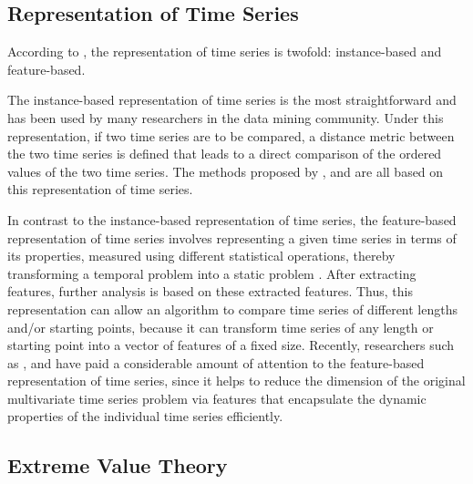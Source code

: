\documentclass{monashthesis}
\theoremstyle{definition}
\theoremstyle{definition}
\theoremstyle{definition}
\theoremstyle{remark}
\begin{document}
\hypertarget{representation-of-time-series}{%
\subsection{Representation of Time Series}\label{representation-of-time-series}}

According to \textcite{fulcher2014highly}, the representation of time series is twofold: instance-based and feature-based.

The instance-based representation of time series is the most
straightforward and has been used by many researchers in the data mining community. Under this representation, if two time series are to be compared, a distance metric between the two time series is defined that leads to a direct comparison of the ordered values of the two time series. The methods proposed by \textcite{wilkinsonvisualizing}, \textcite{clifton2011novelty} and \textcite{hugueny2013novelty} are all based on this representation of time series.

In contrast to the instance-based representation of time series, the feature-based representation of time series involves representing a given time series in terms of its properties, measured using different statistical operations, thereby transforming a temporal problem into a static problem \autocite{fulcher2013highly}. After extracting features, further analysis is based on these extracted features. Thus, this representation can allow an algorithm to compare time series of different lengths and/or starting points, because it can transform time series of any length or starting point into a vector of features of a fixed size. Recently, researchers such as \textcite{wang2006characteristic}, \textcite{fulcher2012highly} and \textcite{hyndman2015large} have paid a considerable amount of attention to the feature-based representation of time series, since it helps to reduce the dimension of the original multivariate time series problem via features that encapsulate the dynamic properties of the individual time series efficiently.

\hypertarget{extreme-value-theory}{%
\subsection{Extreme Value Theory}\label{extreme-value-theory}}
\end{document}
